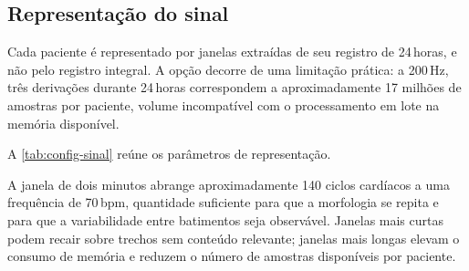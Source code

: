 \subsection{Representação do sinal}
\label{subsec:config-sinal}

Cada paciente é representado por janelas extraídas de seu registro de
24\,horas, e não pelo registro integral. A opção decorre de uma limitação
prática: a 200\,Hz, três derivações durante 24\,horas correspondem a
aproximadamente 17 milhões de amostras por paciente, volume incompatível com
o processamento em lote na memória disponível.

A \autoref{tab:config-sinal} reúne os parâmetros de representação.

\begin{table}[h!]
	\captionsetup{width=14cm}
\end{table}

A janela de dois minutos abrange aproximadamente 140 ciclos cardíacos a uma
frequência de 70\,bpm, quantidade suficiente para que a morfologia se repita
e para que a variabilidade entre batimentos seja observável. Janelas mais
curtas podem recair sobre trechos sem conteúdo relevante; janelas mais longas
elevam o consumo de memória e reduzem o número de amostras disponíveis por
paciente.

